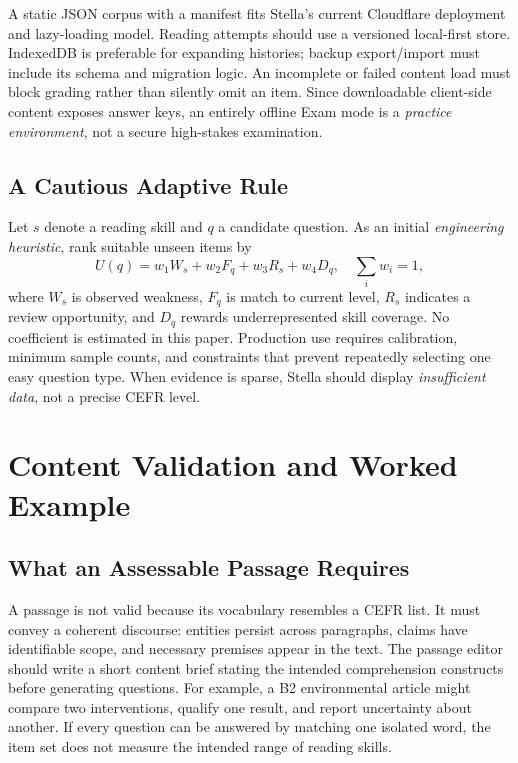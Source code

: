\documentclass[conference,10pt]{IEEEtran}
\begin{document}
A static JSON corpus with a manifest fits Stella's current Cloudflare deployment and lazy-loading model. Reading attempts should use a versioned local-first store. IndexedDB is preferable for expanding histories; backup export/import must include its schema and migration logic. An incomplete or failed content load must block grading rather than silently omit an item. Since downloadable client-side content exposes answer keys, an entirely offline Exam mode is a \emph{practice environment}, not a secure high-stakes examination.

\subsection{A Cautious Adaptive Rule}
Let $s$ denote a reading skill and $q$ a candidate question. As an initial \emph{engineering heuristic}, rank suitable unseen items by
\begin{equation}
U(q)=w_1W_s+w_2F_q+w_3R_s+w_4D_q,\quad \sum_i w_i=1,
\label{eq:selection}
\end{equation}
where $W_s$ is observed weakness, $F_q$ is match to current level, $R_s$ indicates a review opportunity, and $D_q$ rewards underrepresented skill coverage. No coefficient is estimated in this paper. Production use requires calibration, minimum sample counts, and constraints that prevent repeatedly selecting one easy question type. When evidence is sparse, Stella should display \emph{insufficient data}, not a precise CEFR level.


\section{Content Validation and Worked Example}
\subsection{What an Assessable Passage Requires}
A passage is not valid because its vocabulary resembles a CEFR list. It must convey a coherent discourse: entities persist across paragraphs, claims have identifiable scope, and necessary premises appear in the text. The passage editor should write a short content brief stating the intended comprehension constructs before generating questions. For example, a B2 environmental article might compare two interventions, qualify one result, and report uncertainty about another. If every question can be answered by matching one isolated word, the item set does not measure the intended range of reading skills.
\end{document}
